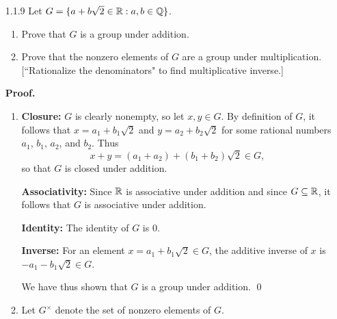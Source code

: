 \begin{enumerate}
\begin{enumerate}
               We have thus shown that $G$ is a group under multiplication. \qed
         \item $G$ is not a group under addition because it is not closed under
               addition. In particular, we have $1 \in G$, but
               $1 + 1 = 2 \notin G$ because $2^n \neq 1$ for any positive
               integer.
      \end{enumerate}
   \item[1.1.9]   Let $G = \{a + b\sqrt{2} \in \mathbb{R} : a, b \in \mathbb{Q}\}$.
                  \begin{enumerate}
                     \item Prove that $G$ is a group under addition.
                     \item Prove that the nonzero elements of $G$ are a group 
                           under multiplication. [``Rationalize the
                           denominators" to find multiplicative inverse.]
                  \end{enumerate}
                  
      \textbf{Proof.}
      
      \begin{enumerate}
         \item \textbf{Closure:} $G$ is clearly nonempty, so let $x, y \in G$.
               By definition of $G$, it follows that $x = a_1 + b_1\sqrt{2}$ and
               $y = a_2 + b_2\sqrt{2}$ for some rational numbers $a_1$, $b_1$,
               $a_2$, and $b_2$. Thus
               $$x + y = (a_1 + a_2) + (b_1 + b_2)\sqrt{2} \in G,$$
               so that $G$ is closed under addition.
               
               \textbf{Associativity:} Since $\mathbb{R}$ is associative under addition
               and since $G \subseteq \mathbb{R}$, it follows that $G$ is associative
               under addition.
               
               \textbf{Identity:} The identity of $G$ is 0.
               
               \textbf{Inverse:} For an element $x = a_1 + b_1\sqrt{2} \in G$,
               the additive inverse of $x$ is $-a_1 - b_1\sqrt{2} \in G$.
               
               We have thus shown that $G$ is a group under addition. \qed
         \item Let $G^{\times}$ denote the set of nonzero elements of $G$.
         

\end{enumerate}
\end{enumerate}
